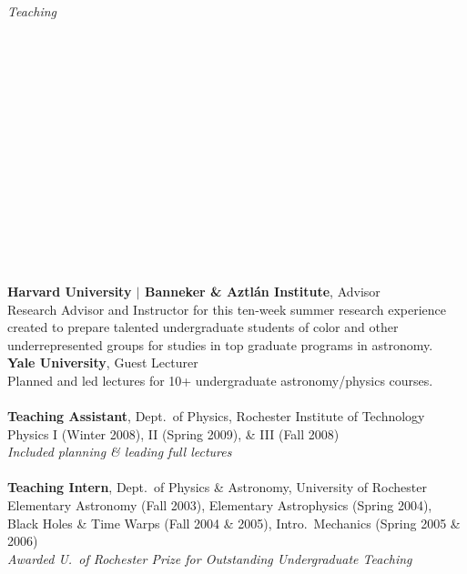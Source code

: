 \documentclass[11pt]{article}
\begin{document}
\hspace{2.5mm} \parbox{1.5in}{\textit{Teaching \\\\\\\\\\\\\\\\\\\\\\\\\\\\\\}} \parbox{5.15in}{

\textbf{Harvard University $|$ Banneker \& Aztl\'{a}n Institute}, Advisor\\
Research Advisor and Instructor for this ten-week summer research
experience created to prepare talented undergraduate students of color and other
underrepresented groups for studies in top graduate programs in astronomy. \\

\textbf{Yale University}, Guest Lecturer\\
Planned and led lectures for 10+ undergraduate astronomy/physics courses. \\
\\
\textbf{Teaching Assistant}, Dept.~of Physics, Rochester Institute of Technology \\
Physics I (Winter 2008), II (Spring 2009), \& III (Fall 2008) \\
\textit{Included planning \& leading full lectures}\\
\\
\textbf{Teaching Intern}, Dept.~of Physics \& Astronomy, University of Rochester \\
Elementary Astronomy (Fall 2003), Elementary Astrophysics (Spring 2004),
Black Holes \& Time Warps (Fall 2004 \& 2005), Intro.~Mechanics (Spring 2005 \& 2006) \\ \textit{Awarded U.~of Rochester Prize for Outstanding Undergraduate Teaching}}




\vspace{4mm}
\end{document}
